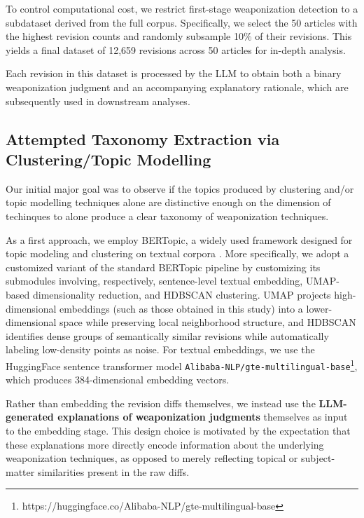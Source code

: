 \documentclass[11pt, a4paper, twoside, openright]{article} %
\begin{document}
To control computational cost, we restrict first-stage weaponization detection to a subdataset derived from the full corpus. Specifically, we select the 50 articles with the highest revision counts and randomly subsample 10\% of their revisions. This yields a final dataset of 12{,}659 revisions across 50 articles for in-depth analysis.

Each revision in this dataset is processed by the LLM to obtain both a binary weaponization judgment and an accompanying explanatory rationale, which are subsequently used in downstream analyses.



\subsection{Attempted Taxonomy Extraction via  Clustering/Topic Modelling}


Our initial major goal was to observe if the topics produced by clustering and/or topic modelling techniques alone are distinctive enough on the dimension of techinques to alone produce a clear taxonomy of weaponization techniques. 

As a first approach, we employ BERTopic, a widely used framework designed for topic modeling and clustering on textual corpora \cite{grootendorst2022bertopic}. More specifically, we adopt a customized variant of the standard BERTopic pipeline by customizing its submodules involving, respectively, sentence-level textual embedding, UMAP-based dimensionality reduction, and HDBSCAN clustering. UMAP projects high-dimensional embeddings (such as those obtained in this study) into a lower-dimensional space while preserving local neighborhood structure, and HDBSCAN identifies dense groups of semantically similar revisions while automatically labeling low-density points as noise. \cite{UMAP}\cite{HDBSCAN}
For textual embeddings, we use the HuggingFace sentence transformer model \texttt{Alibaba-NLP/gte-multilingual-base}\footnote{https://huggingface.co/Alibaba-NLP/gte-multilingual-base}, which produces 384-dimensional embedding vectors.

Rather than embedding the revision diffs themselves, we instead use the \textbf{LLM-generated explanations of weaponization judgments} themselves as input to the embedding stage. This design choice is motivated by the expectation that these explanations more directly encode information about the underlying weaponization techniques, as opposed to merely reflecting topical or subject-matter similarities present in the raw diffs.
\end{document}
